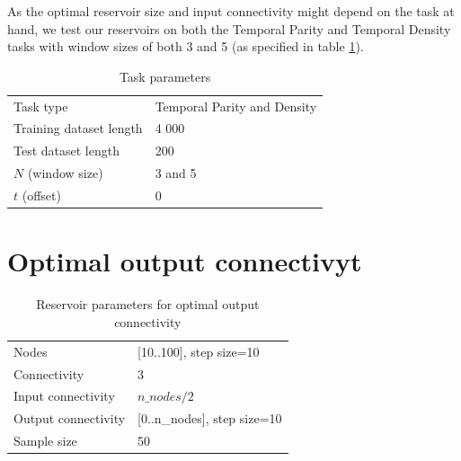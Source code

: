 As the optimal reservoir size and input connectivity might depend on the task at hand,
we test our reservoirs on both the Temporal Parity and Temporal Density tasks with window sizes of both 3 and 5 (as specified in table \ref{tab:tasks}).

\begin{table}[ht]
  \centering
  \caption{Task parameters}
  \label{tab:tasks}
  \begin{tabular}{ll}
    Task type               & Temporal Parity and Density \\
    Training dataset length & 4 000                       \\
    Test dataset length     & 200                         \\
    $N$ (window size)       & 3 and 5                     \\
    $t$ (offset)            & 0
  \end{tabular} 
\end{table} 

\section{Optimal output connectivyt}

\begin{table}[ht]
    \centering
    \caption{Reservoir parameters for optimal output connectivity}
    \begin{tabular}{ll}
        Nodes               & [10..100], step size=10           \\
        Connectivity        & 3                                 \\
        Input connectivity  & $ n\_nodes / 2 $                  \\
        Output connectivity & [0..n\_nodes], step size=10       \\
        Sample size         & 50
    \end{tabular}
\end{table}
